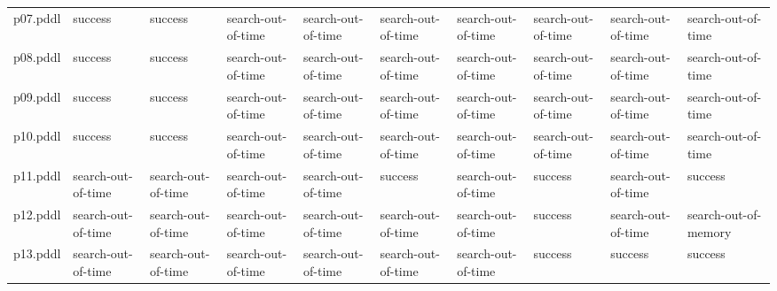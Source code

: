 \documentclass{article}
\begin{document}
\begin{tabular}{@{}lrrrrrrrrr@{}}
p07.pddl & \multicolumn{1}{|l|}{success} & \multicolumn{1}{|l|}{success} & \multicolumn{1}{|l|}{search-out-of-time} & \multicolumn{1}{|l|}{search-out-of-time} & \multicolumn{1}{|l|}{search-out-of-time} & \multicolumn{1}{|l|}{search-out-of-time} & \multicolumn{1}{|l|}{search-out-of-time} & \multicolumn{1}{|l|}{search-out-of-time} & \multicolumn{1}{|l|}{search-out-of-time} \\
p08.pddl & \multicolumn{1}{|l|}{success} & \multicolumn{1}{|l|}{success} & \multicolumn{1}{|l|}{search-out-of-time} & \multicolumn{1}{|l|}{search-out-of-time} & \multicolumn{1}{|l|}{search-out-of-time} & \multicolumn{1}{|l|}{search-out-of-time} & \multicolumn{1}{|l|}{search-out-of-time} & \multicolumn{1}{|l|}{search-out-of-time} & \multicolumn{1}{|l|}{search-out-of-time} \\
p09.pddl & \multicolumn{1}{|l|}{success} & \multicolumn{1}{|l|}{success} & \multicolumn{1}{|l|}{search-out-of-time} & \multicolumn{1}{|l|}{search-out-of-time} & \multicolumn{1}{|l|}{search-out-of-time} & \multicolumn{1}{|l|}{search-out-of-time} & \multicolumn{1}{|l|}{search-out-of-time} & \multicolumn{1}{|l|}{search-out-of-time} & \multicolumn{1}{|l|}{search-out-of-time} \\
p10.pddl & \multicolumn{1}{|l|}{success} & \multicolumn{1}{|l|}{success} & \multicolumn{1}{|l|}{search-out-of-time} & \multicolumn{1}{|l|}{search-out-of-time} & \multicolumn{1}{|l|}{search-out-of-time} & \multicolumn{1}{|l|}{search-out-of-time} & \multicolumn{1}{|l|}{search-out-of-time} & \multicolumn{1}{|l|}{search-out-of-time} & \multicolumn{1}{|l|}{search-out-of-time} \\
p11.pddl & \multicolumn{1}{|l|}{search-out-of-time} & \multicolumn{1}{|l|}{search-out-of-time} & \multicolumn{1}{|l|}{search-out-of-time} & \multicolumn{1}{|l|}{search-out-of-time} & \multicolumn{1}{|l|}{success} & \multicolumn{1}{|l|}{search-out-of-time} & \multicolumn{1}{|l|}{success} & \multicolumn{1}{|l|}{search-out-of-time} & \multicolumn{1}{|l|}{success} \\
p12.pddl & \multicolumn{1}{|l|}{search-out-of-time} & \multicolumn{1}{|l|}{search-out-of-time} & \multicolumn{1}{|l|}{search-out-of-time} & \multicolumn{1}{|l|}{search-out-of-time} & \multicolumn{1}{|l|}{search-out-of-time} & \multicolumn{1}{|l|}{search-out-of-time} & \multicolumn{1}{|l|}{success} & \multicolumn{1}{|l|}{search-out-of-time} & \multicolumn{1}{|l|}{search-out-of-memory} \\
p13.pddl & \multicolumn{1}{|l|}{search-out-of-time} & \multicolumn{1}{|l|}{search-out-of-time} & \multicolumn{1}{|l|}{search-out-of-time} & \multicolumn{1}{|l|}{search-out-of-time} & \multicolumn{1}{|l|}{search-out-of-time} & \multicolumn{1}{|l|}{search-out-of-time} & \multicolumn{1}{|l|}{success} & \multicolumn{1}{|l|}{success} & \multicolumn{1}{|l|}{success} \\

\end{tabular}
\end{document}
